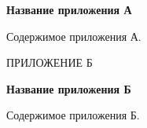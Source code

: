 \documentclass[a4paper,14pt]{extarticle}
\begin{document}
\begin{center}
\textbf{Название приложения А}
\end{center}

Содержимое приложения А.

\newpage

\begin{center}
ПРИЛОЖЕНИЕ Б
\end{center}
\label{app:b}

\begin{center}
\textbf{Название приложения Б}
\end{center}

Содержимое приложения Б.
\end{document}
